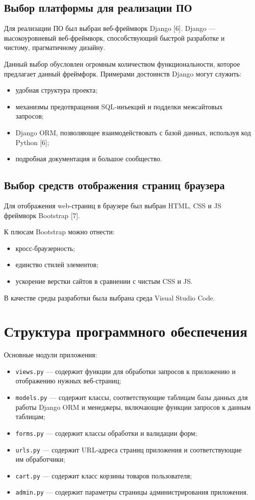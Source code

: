 \subsection{Выбор платформы для реализации ПО}

Для реализации ПО был выбран веб-фреймворк Django [6].
Django --- высокоуровневый веб-фреймворк, способствующий быстрой разработке и чистому, прагматичному дизайну.

Данный выбор обусловлен огромным количеством функциональности, которое предлагает данный фреймфорк. Примерами достоинств Django могут служить:
\begin{itemize}
	\item удобная структура проекта;
	\item механизмы предотвращения SQL-инъекций и подделки межсайтовых запросов;
	\item Django ORM, позволяющее взаимодействовать с базой данных, используя код Python [6];
	\item подробная документация и большое сообщество.
\end{itemize}

\subsection{Выбор средств отображения страниц браузера}

Для отображения web-страниц в браузере был выбран HTML, CSS и JS фреймворк Bootstrap [7].

К плюсам Bootstrap можно отнести:
\begin{itemize}
	\item кросс-браузерность;
	\item единство стилей элементов;
	\item ускорение верстки сайтов в сравнении с чистым CSS и JS.
\end{itemize}

В качестве среды разработки была выбрана среда Visual Studio Code.

\section{Структура программного обеспечения}
Основные модули приложения:
\begin{itemize}
	\item \verb;views.py; --- содержит функции для обработки запросов к приложению и отображению нужных веб-страниц;
	\item \verb;models.py; --- содержит классы, соответствующие таблицам базы данных для работы Django ORM и менеджеры, включающие функции запросов к данным таблицам;
	\item \verb;forms.py; --- содержит классы обработки и валидации форм;
	\item \verb;urls.py; --- содержит URL-адреса страниц приложения и соответствующие им обработчики;
	\item \verb;cart.py; --- содержит класс корзины товаров пользователя;
	\item \verb;admin.py; --- содержит параметры страницы администрирования приложения.
\end{itemize}

